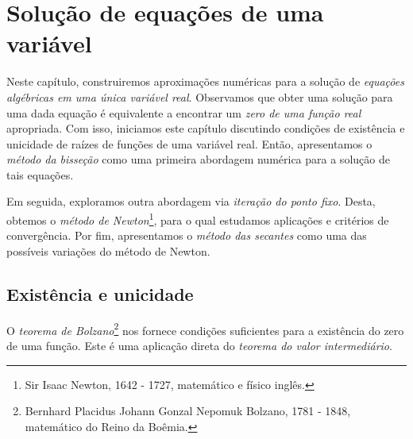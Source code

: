 
%

\chapter{Solução de equações de uma variável}\label{cap:equacao1d}

Neste capítulo, construiremos aproximações numéricas para a solução de \emph{equações algébricas em uma única variável real}. Observamos que obter uma solução para uma dada equação é equivalente a encontrar um \emph{zero de uma função real} apropriada. Com isso, iniciamos este capítulo discutindo condições de existência e unicidade de raízes de funções de uma variável real. Então, apresentamos o \emph{método da bisseção} como uma primeira abordagem numérica para a solução de tais equações.

Em seguida, exploramos outra abordagem via \emph{iteração do ponto fixo}. Desta, obtemos o \emph{método de Newton}\footnote{Sir Isaac Newton, 1642 - 1727, matemático e físico inglês.}, para o qual estudamos aplicações e critérios de convergência. Por fim, apresentamos o \emph{método das secantes} como uma das possíveis variações do método de Newton.

\section{Existência e unicidade}

O \emph{teorema de Bolzano}\footnote{Bernhard Placidus Johann Gonzal Nepomuk Bolzano, 1781 - 1848, matemático do Reino da Boêmia.} nos fornece condições suficientes para a existência do zero de uma função. Este é uma aplicação direta do \emph{teorema do valor intermediário}.

